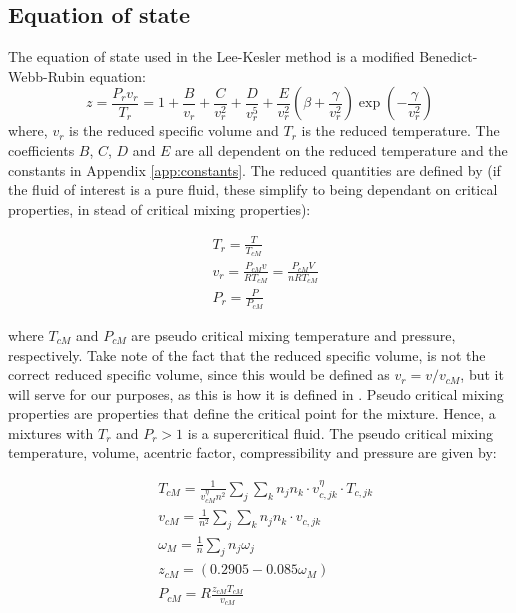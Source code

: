 \documentclass[internal,english]{sintefmemo2012}
\numberwithin{equation}{section}
\begin{document}
\subsection{Equation of state}
The equation of state used in the Lee-Kesler method is a modified Benedict-Webb-Rubin equation:
\begin{equation}
\label{def:z_LK}
z = \frac{P_r v_r}{T_r} = 1 + \frac{B}{v_r} + \frac{C}{v_r^2} + \frac{D}{v_r^5} + \frac{E}{v_r^2} \left( \beta + \frac{\gamma}{v_r^2} \right) \exp{\left(-\frac{\gamma}{v_r^2}\right)}
\end{equation}
where, $v_r$ is the reduced specific volume and $T_r$ is the reduced temperature. The coefficients $B$, $C$, $D$ and $E$ are all dependent on the reduced temperature and the constants in Appendix \ref{app:constants}. The reduced quantities are defined by (if the fluid of interest is a pure fluid, these simplify to being dependant on critical properties, in stead of critical mixing properties):

\begin{align}
& T_r = \frac{T}{T_{cM}} \label{eq:T_r} \\
& v_r = \frac{P_{cM} v}{R T_{cM}} = \frac{P_{cM} V}{n R T_{cM}} \label{eq:v_r} \\
& P_r = \frac{P}{P_{cM}} \label{eq:P_r} 
\end{align}

where $T_{cM}$ and $P_{cM}$ are pseudo critical mixing temperature and pressure, respectively. Take note of the fact that the reduced specific volume, is not the correct reduced specific volume, since this would be defined as $v_r = v/v_{cM}$, but it will serve for our purposes, as this is how it is defined in \cite{LK}. Pseudo critical mixing properties are properties that define the critical point for the mixture. Hence, a mixtures with $T_r$ and $P_r > 1$ is a supercritical fluid. The pseudo critical mixing temperature, volume, acentric factor, compressibility and pressure are given by:

\begin{align}
\label{eq:TcM}
& T_{cM} = \frac{1}{v_{cM}^\eta n^2} \sum_j \sum_k n_j n_k \cdot v_{c,jk}^\eta \cdot T_{c,jk} \\ 
\label{eq:vcM}
& v_{cM} = \frac{1}{n^2} \sum_j \sum_k n_j n_k \cdot v_{c,jk} \\ 
\label{eq:wM}
& \omega_M = \frac{1}{n} \sum_j n_j \omega_j  \\ 
\label{eq:zcM}
& z_{cM} = (0.2905 - 0.085 \omega_M)  \\
\label{eq:PcM}
& P_{cM} = R\frac{z_{cM} T_{cM}}{v_{cM}} 
\end{align}
\end{document}
